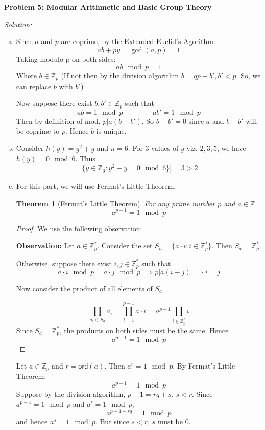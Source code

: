 \documentclass[a4paper, 11pt]{article}
\newtheorem{theorem}{Theorem}
\newenvironment{solution}
    {\textit{Solution:}}
    {\clearpage}
\newcommand{\prob}[1]{\begin{mdframed}[backgroundcolor=gray!20] \textbf{Problem #1}\end{mdframed}}
\newcommand{\ord}{\mathsf{ord}}
\newcommand{\Z}{\mathbb{Z}}
\begin{document}
\prob{5: Modular Arithmetic and Basic Group Theory}
\begin{solution}
    \begin{enumerate}[(a)]
        \item Since $a$ and $p$ are coprime, by the Extended Euclid's Agorithm:
              $$ ab+py=\gcd(a,p)=1    $$
              Taking modulo p on both sides:
              $$ ab \mod p =1    $$
              Where $b\in\Z_p$ (If not then by the division algorithm $b=qp+b', b'<p$. So, we can replace $b$ with $b'$)
              \vspace{20pt}

              Now suppose there exist $b, b'\in\Z_p$ such that
              $$ ab=1\mod p \hspace{50pt} ab'=1\mod p    $$
              Then by definition of mod, $p|a(b-b')$. So $b-b'=0$ since $a$ and $b-b'$ will be coprime to $p$. Hence $b$ is unique.

        \item Consider $h(y)=y^2+y$ and $n=6$. For 3 values of $y$ viz. $2,3,5$, we have $h(y)=0\mod 6$. Thus
              $$|\{y\in\Z_6:y^2+y=0\mod6\}|=3>2$$

        \item For this part, we will use Fermat's Little Theorem.
              \begin{theorem}[Fermat's Little Theorem]
                  For any prime number $p$ and $a\in\Z$
                  $$a^{p-1}=1\mod p$$
              \end{theorem}
              \begin{proof}
                  We use the following observation:

                  \textbf{Observation:} Let $a \in\Z^*_p$. Consider the set $S_a = \{a\cdot i: i\in\Z^*_p\}$. Then $S_a = \Z^*_p$.

                  Otherwise, suppose there exist $i,j\in\Z^*_p$ such that $$a\cdot i \mod p= a\cdot j\mod p\implies p | a (i-j)\implies i=j$$

                  Now consider the product of all elements of $S_a$

                  $$\prod_{a_i\in S_a}a_i=\prod_{i=1}^{p-1}a\cdot i=a^{p-1}\prod_{i\in\Z^*_p}i$$
                  Since $S_a = \Z^*_p$, the products on both sides must be the same. Hence $$a^{p-1}=1\mod p$$


              \end{proof}
              Let $a\in\Z_p$ and $r=\ord(a)$. Then $a^r=1\mod p$. By Fermat's Little Theorem:
              $$a^{p-1}=1\mod p$$
              Suppose by the division algorithm, $p-1=rq+s$, $s<r$. Since $a^{p-1}=1\mod p$ and $a^{r}=1\mod p$, $$a^{p-1-rq}=1\mod p$$ and hence $a^{s}=1\mod p$. But since $s<r$, $s$ must be 0.


\end{enumerate}
\end{solution}
\end{document}
